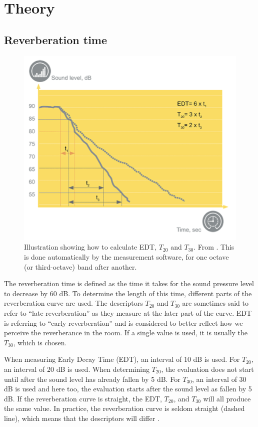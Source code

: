 \documentclass{article}
\begin{document}
\section{Theory}

\subsection{Reverberation time}

\begin{figure}[H]
    \centering
    \includegraphics{figs/edt_t20_t30.png}
    \caption{Illustration showing how to calculate EDT, $T_{20}$ and $T_{30}$. From \cite{reverb}. This is done automatically by the measurement software, for one octave (or third-octave) band after another.}
    \label{fig:reverb}
\end{figure}

The reverberation time is defined as the time it takes for the sound pressure level to decrease by 60 dB. To determine the length of this time, different parts of the reverberation curve are used. The descriptors $T_{20}$ and $T_{30}$ are sometimes said to refer to “late reverberation” as they measure at the later part of the curve. EDT is referring to “early reverberation” and is considered to better reflect how we perceive the reverberance in the room. If a single value is used, it is usually the $T_{30}$, which is chosen.

When measuring Early Decay Time (EDT), an interval of 10 dB is used. For $T_{20}$, an interval of 20 dB is used. When determining $T_{20}$, the evaluation does not start until after the sound level has already fallen by 5 dB. For $T_{30}$, an interval of 30 dB is used and here too, the evaluation starts after the sound level as fallen by 5 dB.  If the reverberation curve is straight, the EDT, $T_{20}$, and $T_{30}$ will all produce the same value. In practice, the reverberation curve is seldom straight (dashed line), which means that the descriptors will differ \cite{reverb}.
\end{document}

